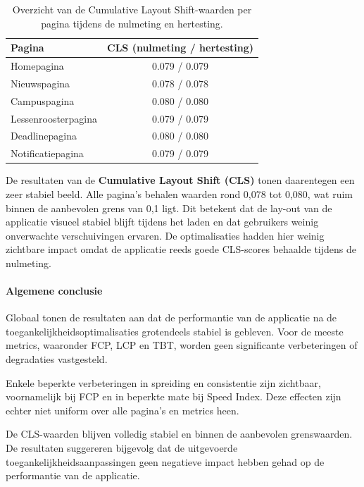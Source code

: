 \begin{table}[H]
\centering
\caption[CLS-waarden per pagina: nulmeting en hertesting]{Overzicht van de Cumulative Layout Shift-waarden per pagina tijdens de nulmeting en hertesting.}
\label{tab:cls-hertesting-per-pagina}
\begin{tabular}{lc}
\hline
\textbf{Pagina} & \textbf{CLS (nulmeting / hertesting)} \\
\hline
Homepagina & 0.079 / 0.079 \\
Nieuwspagina & 0.078 / 0.078 \\
Campuspagina & 0.080 / 0.080 \\
Lessenroosterpagina & 0.079 / 0.079 \\
Deadlinepagina & 0.080 / 0.080 \\
Notificatiepagina & 0.079 / 0.079 \\
\hline
\end{tabular}
\end{table}

De resultaten van de \textbf{Cumulative Layout Shift (CLS)} tonen daarentegen een zeer stabiel beeld. Alle pagina’s behalen waarden rond 0,078 tot 0,080, wat ruim binnen de aanbevolen grens van 0,1 ligt. Dit betekent dat de lay-out van de applicatie visueel stabiel blijft tijdens het laden en dat gebruikers weinig onverwachte verschuivingen ervaren. De optimalisaties hadden hier weinig zichtbare impact omdat de applicatie reeds goede CLS-scores behaalde tijdens de nulmeting.


\paragraph{Algemene conclusie}

Globaal tonen de resultaten aan dat de performantie van de applicatie na de toegankelijkheidsoptimalisaties grotendeels stabiel is gebleven. Voor de meeste metrics, waaronder FCP, LCP en TBT, worden geen significante verbeteringen of degradaties vastgesteld.

Enkele beperkte verbeteringen in spreiding en consistentie zijn zichtbaar, voornamelijk bij FCP en in beperkte mate bij Speed Index. Deze effecten zijn echter niet uniform over alle pagina’s en metrics heen.

De CLS-waarden blijven volledig stabiel en binnen de aanbevolen grenswaarden. De resultaten suggereren bijgevolg dat de uitgevoerde toegankelijkheidsaanpassingen geen negatieve impact hebben gehad op de performantie van de applicatie.

